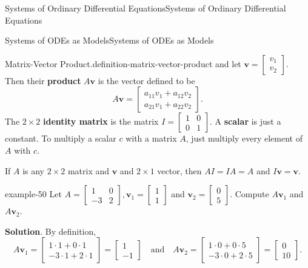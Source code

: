 \documentclass[10pt,]{book}
\newcommand{\terminology}[1]{\textbf{#1}}
\numberwithin{equation}{section}
\renewcommand{\vec}[1]{\mathbf{#1}}
\newcommand{\amp}{&}
\begin{document}
\begin{chapterptx}{Systems of Ordinary Differential Equations}{}{Systems of Ordinary Differential Equations}{}{}
\begin{sectionptx}{Systems of ODEs as Models}{}{Systems of ODEs as Models}{}{}
\begin{definition}{Matrix-Vector Product.}{definition-matrix-vector-product}
and let \(\vec{v} = \begin{bmatrix} v_{1}\\v_{2} \end{bmatrix}\). Then their \terminology{product} \(A\vec{v}\) is the vector defined to be%
\begin{equation*}
A\vec{v} = \begin{bmatrix} a_{11}v_{1}+a_{12}v_{2}\\a_{21}v_{1}+a_{22}v_{2} \end{bmatrix}.
\end{equation*}
The \(2\times 2\) \terminology{identity matrix} is the matrix \(I = \begin{bmatrix}1\amp0\\0\amp1\end{bmatrix}\). A \terminology{scalar} is just a constant. To multiply a scalar \(c\) with a matrix \(A\), just multiply every element of \(A\) with \(c\).%
\end{definition}
\hypertarget{p-307}{}%
If \(A\) is any \(2\times2\) matrix and \(\vec{v}\) and \(2\times1\) vector, then \(AI=IA=A\) and \(I\vec{v} = \vec{v}\).%
\begin{example}{}{example-50}%
\hypertarget{p-308}{}%
Let \(A = \begin{bmatrix} 1\amp0\\-3\amp2 \end{bmatrix},\vec{v}_{1} = \begin{bmatrix}1\\1\end{bmatrix}\) and \(\vec{v}_{2} = \begin{bmatrix}0\\5\end{bmatrix}\). Compute \(A\vec{v}_{1}\) and \(A\vec{v}_{2}\).%
\par\smallskip%
\noindent\textbf{Solution}.\hypertarget{solution-47}{}\quad%
\hypertarget{p-309}{}%
By definition,%
\begin{equation*}
A\vec{v}_{1} = \begin{bmatrix}1\cdot1+0\cdot1\\-3\cdot1+2\cdot1\end{bmatrix} = \begin{bmatrix}1\\-1\end{bmatrix}\quad\text{and}\quad A\vec{v}_{2} = \begin{bmatrix}1\cdot0+0\cdot5\\-3\cdot0+2\cdot5\end{bmatrix} = \begin{bmatrix}0\\10\end{bmatrix}.

\end{equation*}
\end{example}
\end{sectionptx}
\end{chapterptx}
\end{document}
